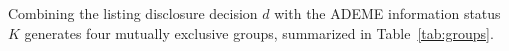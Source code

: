 Combining the listing disclosure decision $d$ with the ADEME information status $K$ generates four mutually exclusive groups, summarized in Table~\ref{tab:groups}.

